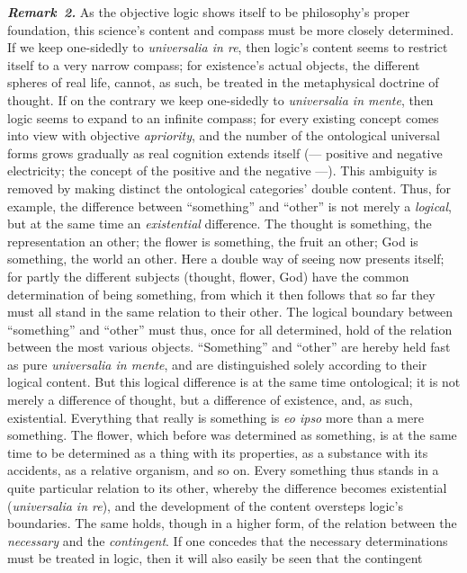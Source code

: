 \documentclass[12pt]{book}
\newcommand{\anm}[1]{\emph{\textbf{Remark~#1.}}}
\begin{document}
\anm{2} As the objective logic shows itself to be philosophy's proper
foundation, this science's content and compass must be more closely
determined. If we keep one-sidedly to \textit{universalia in re}, then
logic's content seems to restrict itself to a very narrow compass; for
existence's actual objects, the different spheres of real life, cannot, as
such, be treated in the metaphysical doctrine of thought. If on the contrary
we keep one-sidedly to \textit{universalia in mente}, then logic seems to
expand to an infinite compass; for every existing concept comes into view
with objective \emph{apriority}, and the number of the ontological universal
forms grows gradually as real cognition extends itself (--- positive and
negative electricity; the concept of the positive and the negative ---).
This ambiguity is removed by making distinct the ontological categories'
double content. Thus, for example, the difference between ``something'' and
``other'' is not merely a \emph{logical}, but at the same time an
\emph{existential} difference. The thought is something, the representation
an other; the flower is something, the fruit an other; God is something, the
world an other. Here a double way of seeing now presents itself; for partly
the different subjects (thought, flower, God) have the common determination
of being something, from which it then follows that so far they must all
stand in the same relation to their other. The logical boundary between
``something'' and ``other'' must thus, once for all determined, hold of the
relation between the most various objects. ``Something'' and ``other'' are
hereby held fast as pure \textit{universalia in mente}, and are
distinguished solely according to their logical content. But this logical
difference is at the same time ontological; it is not merely a difference of
thought, but a difference of existence, and, as such, existential.
Everything that really is something is \textit{eo ipso} more than a mere
something. The flower, which before was determined as something, is at the
same time to be determined as a thing with its properties, as a substance
with its accidents, as a relative organism, and so on. Every something thus
stands in a quite particular relation to its other, whereby the difference
becomes existential (\textit{universalia in re}), and the development of the
content oversteps logic's boundaries. The same holds, though in a higher
form, of the relation between the \emph{necessary} and the
\emph{contingent}. If one concedes that the necessary determinations must be
treated in logic, then it will also easily be seen that the contingent
\end{document}
